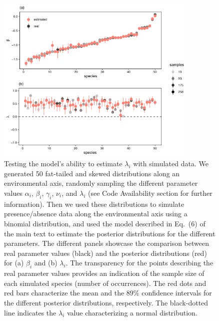 \documentclass[11pt, a4paper]{article}
\begin{document}
\begin{figure}[ht]
  \centering
    \vspace{0.5cm}
    \includegraphics[width=0.85\textwidth]{figures/lambda-test}
    	  \vspace{0.3cm}
	   \caption{Testing the model's ability to estimate $\lambda_i$ with simulated data. We generated 50 fat-tailed and skewed distributions along an environmental axis, randomly sampling the different parameter values $\alpha_i$, $\beta_i$, $\gamma_i$, $\nu_i$, and $\lambda_i$ (see Code Availability section for further information). Then we used these distributions to simulate presence/absence data along the environmental axis using a binomial distribution, and used the model described in Eq.~(6) of the main text to estimate the posterior distributions for the different parameters. The different panels showcase the comparison between real parameter values (black) and the posterior distributions (red) for (a) $\beta_i$ and (b) $\lambda_i$. The transparency for the points describing the real parameter values provides an indication of the sample size of each simulated species (number of occurrences). The red dots and red bars characterize the mean and the $89\%$ confidence intervals for the different posterior distributions, respectively. The black-dotted line indicates the $\lambda_i$ value characterizing a normal distribution.}
      \label{sfig:simulated-lambdas}
\end{figure}

\clearpage
\end{document}
